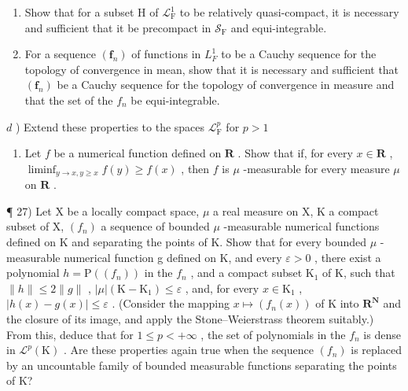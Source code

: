 \begin{enumerate}
\def\labelenumi{\alph{enumi})}
\setcounter{enumi}{1}
\item
  Show that for a subset H of \(\mathcal{L}_{\mathrm{F}}^{1}\) to be relatively quasi-compact, it is necessary and sufficient that it be precompact in \(\mathcal{S}_{\mathrm{F}}\) and equi-integrable.
\item
  For a sequence \((\mathbf{f}_{n})\) of functions in \(L_{F}^{1}\) to be a Cauchy sequence for the topology of convergence in mean, show that it is necessary and sufficient that \((\mathbf{f}_{n})\) be a Cauchy sequence for the topology of convergence in measure and that the set of the \(f_{n}\) be equi-integrable.
\end{enumerate}

\(d\) ) Extend these properties to the spaces \(\mathcal{L}_{\mathrm{F}}^{p}\) for \(p > 1\)

\begin{enumerate}
\def\labelenumi{\arabic{enumi})}
\setcounter{enumi}{25}
\tightlist
\item
  Let \(f\) be a numerical function defined on \(\mathbf{R}\) . Show that if, for every \(x \in \mathbf{R}\) , \(\liminf_{y \to x, y \geqslant x} f(y) \geqslant f(x)\) , then \(f\) is \(\mu\) -measurable for every measure \(\mu\) on \(\mathbf{R}\) .
\end{enumerate}

¶ 27) Let X be a locally compact space, \(\mu\) a real measure on X, K a compact subset of X, \((f_n)\) a sequence of bounded \(\mu\) -measurable numerical functions defined on K and separating the points of K. Show that for every bounded \(\mu\) -measurable numerical function g defined on K, and every \(\varepsilon > 0\) , there exist a polynomial \(h = \mathrm{P}((f_n))\) in the \(f_n\) , and a compact subset \(\mathrm{K}_1\) of K, such that \(\|h\| \leqslant 2\|g\|\) , \(|\mu|(\mathrm{K} - \mathrm{K}_1) \leqslant \varepsilon\) , and, for every \(x \in \mathrm{K}_1\) , \(|h(x) - g(x)| \leqslant \varepsilon\) . (Consider the mapping \(x \mapsto (f_n(x))\) of K into \(\mathbf{R}^{\mathbf{N}}\) and the closure of its image, and apply the Stone--Weierstrass theorem suitably.) From this, deduce that for \(1 \leqslant p < +\infty\) , the set of polynomials in the \(f_n\) is dense in \(\mathcal{L}^p(\mathrm{K})\) . Are these properties again true when the sequence \((f_n)\) is replaced by an uncountable family of bounded measurable functions separating the points of K?

